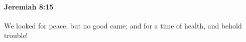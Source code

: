 
		\paragraph{Jeremiah 8:15} %
			\label{JEREMIAH-8-15}

			We looked for peace, but no good came; and for a time of health, and behold trouble!


